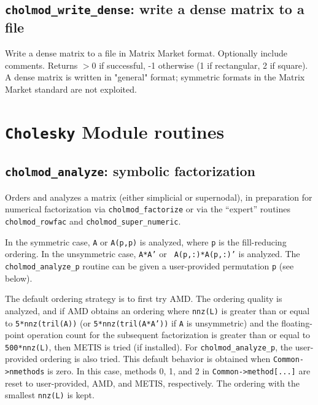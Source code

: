 \documentclass[11pt]{article}
\begin{document}
\subsection{{\tt cholmod\_write\_dense}: write a dense matrix to a file}


Write a dense matrix to a file in Matrix Market format.   Optionally include
comments.  Returns $> 0$ if successful, -1 otherwise (1 if rectangular, 2 if
square).  A dense matrix is written in "general" format; symmetric formats in
the Matrix Market standard are not exploited.

\newpage \section{{\tt Cholesky} Module routines}

\subsection{{\tt cholmod\_analyze}: symbolic factorization}


Orders and analyzes a matrix (either simplicial or supernodal), in preparation
for numerical factorization via {\tt cholmod\_factorize} or via the ``expert''
routines {\tt cholmod\_rowfac} and {\tt cholmod\_super\_numeric}.

In the symmetric case, {\tt A} or {\tt A(p,p)} is analyzed, where {\tt p} is
the fill-reducing ordering.  In the unsymmetric case, {\tt A*A'} or {\tt
A(p,:)*A(p,:)'} is analyzed.  The {\tt cholmod\_analyze\_p} routine can be
given a user-provided permutation {\tt p} (see below).

The default ordering strategy is to first try AMD.  The ordering quality is
analyzed, and if AMD obtains an ordering where {\tt nnz(L)} is greater than or
equal to {\tt 5*nnz(tril(A))} (or {\tt 5*nnz(tril(A*A'))} if {\tt A} is
unsymmetric) and the floating-point operation count for the subsequent
factorization is greater than or equal to {\tt 500*nnz(L)}, then METIS is tried
(if installed).  For {\tt cholmod\_analyze\_p}, the user-provided ordering is
also tried.  This default behavior is obtained when {\tt Common->nmethods} is
zero.  In this case, methods 0, 1, and 2 in {\tt Common->method[...]} are reset
to user-provided, AMD, and METIS, respectively.  The ordering with the smallest
{\tt nnz(L)} is kept.
\end{document}
